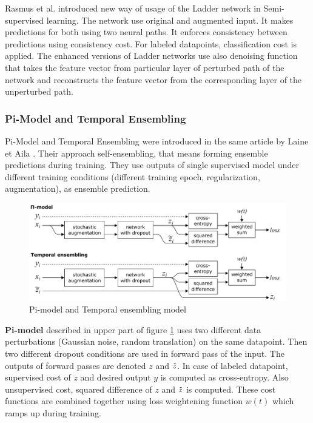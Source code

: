 Rasmus et al. \cite{Rasmus2015} introduced new way of usage of the Ladder network in Semi-supervised learning. The network use original and augmented input. It makes predictions for both using two neural paths. It enforces consistency between predictions using consistency cost. For labeled datapoints, classification cost is applied. The enhanced versions of Ladder networks use also denoising function that takes the feature vector from particular layer of perturbed
path of the network and reconstructs the feature vector from the corresponding layer of the unperturbed path. \cite{tuna}

\subsubsection{Pi-Model and Temporal Ensembling}
Pi-Model and Temporal Ensembling were introduced in the same article by Laine et Aila \cite{laine2017}. Their approach self-ensembling, that means forming ensemble predictions during training. They use outputs of single supervised model under different training conditions (different training epoch, regularization, augmentation), as ensemble prediction.

\begin{figure}[h!]
    \centering
    \includegraphics[width = 1\textwidth]{figs/pi-tempens.pdf}
    \caption{Pi-model and Temporal ensembling model \cite{laine2017}}
    \label{fig:pi-tempens}
\end{figure}

\textbf{Pi-model} described in upper part of figure \ref{fig:pi-tempens} uses two different data perturbations (Gaussian noise, random translation) on the same datapoint. Then two different dropout conditions are used in forward pass of the input. The outputs of forward passes are denoted $z$ and $\Tilde{z}$. In case of labeled datapoint, supervised cost of $z$ and desired output $y$ is computed as cross-entropy. Also unsupervised cost, squared difference of $z$ and $\Tilde{z}$ is computed. These cost functions are combined together using loss weightening function $w(t)$ which ramps up during training.

